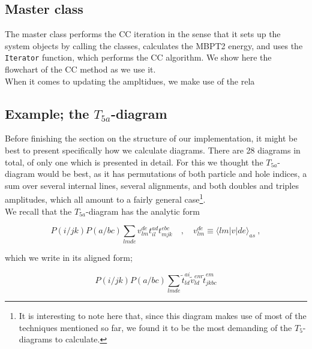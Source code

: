 \documentclass[10pt,twoside]{report}
\begin{document}
	\newpage
	\begin{figure}
		\vspace{-0.5cm}
		
		\vspace{-3cm} 
	\end{figure}
	
	\subsection{Master class}
	The master class performs the CC iteration in the sense that it sets up the system objects by calling the classes, calculates the MBPT2 energy, and uses the \texttt{Iterator} function, which performs the CC algorithm. We show here the flowchart of the CC method as we use it.\\
	
	When it comes to updating the ampltidues, we make use of the rela
	
	\subsection{Example; the $T_{5a}$-diagram}
	\label{Implementation | sec | "example"}
	Before finishing the section on the structure of our implementation, it might be best to present specifically how we calculate diagrams. There are 28 diagrams in total, of only one which is presented in detail. For this we thought the $T_{5a}$-diagram would be best, as it has permutations of both particle and hole indices, a sum over several internal lines, several alignments, and both doubles and triples amplitudes, which all amount to a fairly general case\footnote{It is interesting to note here that, since this diagram makes use of most of the techniques mentioned so far, we found it to be the most demanding of the $T_5$-diagrams to calculate.}.\\
	
	We recall that the $T_{5a}$-diagram has the analytic form
	
	\begin{equation}
		P(i/jk)P(a/bc)\sum_{lmde} v_{lm}^{de}t_{il}^{ad}t_{mjk}^{ebc} \quad,\quad v_{lm}^{de}\equiv \langle lm|v|de\rangle_{as} \:,
	\end{equation}
	
	\noindent which we write in its aligned form;
	
	\begin{equation}
	P(i/jk)P(a/bc)\sum_{lmde} \tilde{t}_{ld}^{ai}\tilde{v}_{ld}^{em}\tilde{t}_{jkbc}^{em}
	\label{Implementation | eq | "T5a aligned"}
	\end{equation}
	
\end{document}
